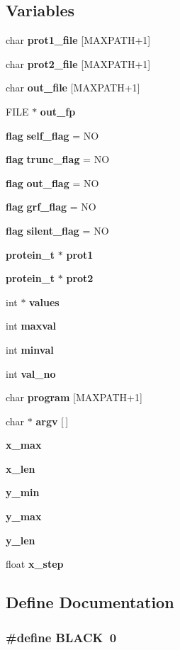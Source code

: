 \subsection*{Variables}
\begin{CompactItemize}
\item 
char {\bf prot1\_\-file} [MAXPATH+1]
\item 
char {\bf prot2\_\-file} [MAXPATH+1]
\item 
char {\bf out\_\-file} [MAXPATH+1]
\item 
FILE $\ast$ {\bf out\_\-fp}
\item 
{\bf flag} {\bf self\_\-flag} = NO
\item 
{\bf flag} {\bf trunc\_\-flag} = NO
\item 
{\bf flag} {\bf out\_\-flag} = NO
\item 
{\bf flag} {\bf grf\_\-flag} = NO
\item 
{\bf flag} {\bf silent\_\-flag} = NO
\item 
{\bf protein\_\-t} $\ast$ {\bf prot1}
\item 
{\bf protein\_\-t} $\ast$ {\bf prot2}
\item 
int $\ast$ {\bf values}
\item 
int {\bf maxval}
\item 
int {\bf minval}
\item 
int {\bf val\_\-no}
\item 
char {\bf program} [MAXPATH+1]
\item 
char $\ast$ {\bf argv} [$\,$]
\item 
{\bf x\_\-max}
\item 
{\bf x\_\-len}
\item 
{\bf y\_\-min}
\item 
{\bf y\_\-max}
\item 
{\bf y\_\-len}
\item 
float {\bf x\_\-step}
\end{CompactItemize}


\subsection{Define Documentation}
\subsubsection{\setlength{\rightskip}{0pt plus 5cm}\#define BLACK\ 0}\label{Pilar__10_8c_a2}


